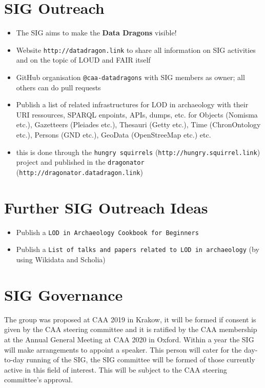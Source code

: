 \documentclass[a4paper]{article}
\begin{document}
\section{SIG Outreach}\label{sig-outreach}

\begin{itemize}
\item
  The SIG aims to make the \textbf{Data Dragons} visible!
\item
  Website \texttt{http://datadragon.link} to share all information on SIG activities and on the topic of LOUD and FAIR itself
\item
  GitHub organisation \texttt{@caa-datadragons} with SIG members as owner; all others can do pull requests
\item
  Publish a list of related infrastructures for LOD in archaeology with their URI ressources, SPARQL enpoints, APIs, dumps, etc. for Objects (Nomisma etc.), Gazetteers (Pleiades etc.), Thesauri (Getty etc.), Time (ChronOntology etc.), Persons (GND etc.), GeoData (OpenStreeMap etc.) etc.
\item
  this is done through the \texttt{hungry\ squirrels} (\texttt{http://hungry.squirrel.link}) project and published in the \texttt{dragonator} (\texttt{http://dragonator.datadragon.link})
\end{itemize}

\section{Further SIG Outreach Ideas}\label{further-sig-outreach-ideas}

\begin{itemize}
\item
  Publish a \texttt{LOD\ in\ Archaeology\ Cookbook\ for\ Beginners}
\item
  Publish a \texttt{List\ of\ talks\ and\ papers\ related\ to\ LOD\ in\ archaeology} (by using Wikidata and Scholia)
\end{itemize}

\section{SIG Governance}\label{sig-governance}

The group was proposed at CAA 2019 in Krakow, it will be formed if consent is given by the CAA steering committee and it is ratified by the CAA membership at the Annual General Meeting at CAA 2020 in Oxford. Within a year the SIG will make arrangements to appoint a speaker. This person will cater for the day-to-day running of the SIG, the SIG committee will be formed of those currently active in this field of interest. This will be subject to the CAA steering committee's approval.
\end{document}
